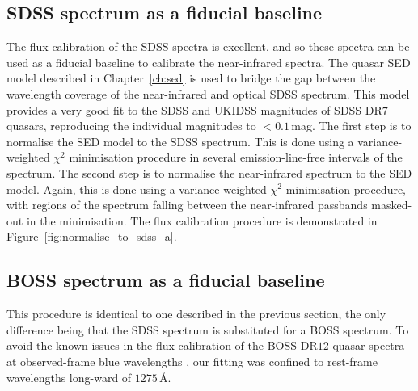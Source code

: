 \subsection{SDSS spectrum as a fiducial baseline}

The flux calibration of the SDSS spectra is excellent, and so these spectra can be used as a fiducial baseline to calibrate the near-infrared spectra. 
The quasar SED model described in Chapter~\ref{ch:sed} is used to bridge the gap between the wavelength coverage of the near-infrared and optical SDSS spectrum.
This model provides a very good fit to the SDSS and UKIDSS magnitudes of SDSS DR$7$ quasars, reproducing the individual magnitudes to $<0.1$\,mag.
The first step is to normalise the SED model to the SDSS spectrum. 
This is done using a variance-weighted $\chi^2$ minimisation procedure in several emission-line-free intervals of the spectrum.   
The second step is to normalise the near-infrared spectrum to the SED model. 
Again, this is done using a variance-weighted $\chi^2$ minimisation procedure, with regions of the spectrum falling between the near-infrared passbands masked-out in the minimisation. 
The flux calibration procedure is demonstrated in Figure~\ref{fig:normalise_to_sdss_a}. 

\subsection{BOSS spectrum as a fiducial baseline}

This procedure is identical to one described in the previous section, the only difference being that the SDSS spectrum is substituted for a BOSS spectrum. 
To avoid the known issues in the flux calibration of the BOSS DR$12$ quasar spectra at observed-frame blue wavelengths \citep{lee13}, our fitting was confined to rest-frame wavelengths long-ward of $1275$\,\AA.

